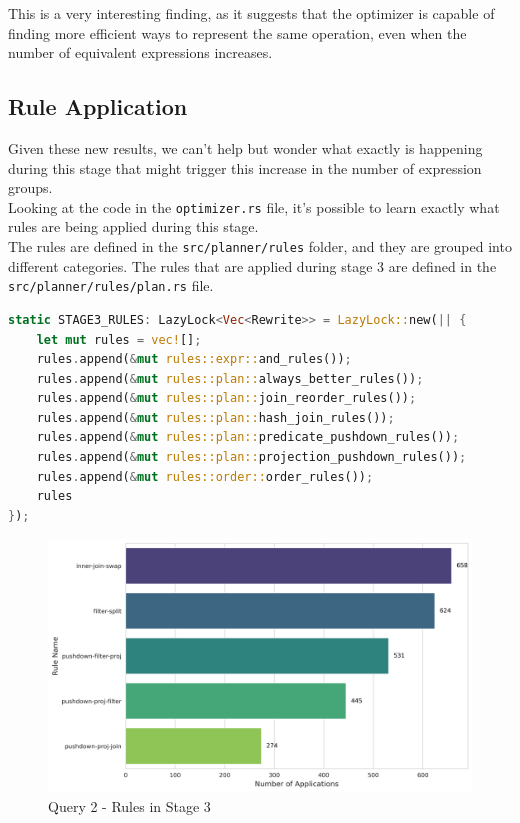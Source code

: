 \documentclass[a4paper,12pt]{scrreprt}
\begin{document}
This is a very interesting finding, as it suggests that the optimizer is capable of finding more efficient ways to represent the same operation, even when the number of equivalent expressions increases. \\

\subsection{Rule Application}

Given these new results, we can't help but wonder what exactly is happening during this stage that might trigger this increase in the number of expression groups. \\ Looking at the code in the \texttt{optimizer.rs} file, it's possible to learn exactly what rules are being applied during this stage. \\

The rules are defined in the \texttt{src/planner/rules} folder, and they are grouped into different categories. The rules that are applied during stage 3 are defined in the \texttt{src/planner/rules/plan.rs} file. \\

\begin{lstlisting}[language=Rust]
static STAGE3_RULES: LazyLock<Vec<Rewrite>> = LazyLock::new(|| {
    let mut rules = vec![];
    rules.append(&mut rules::expr::and_rules());
    rules.append(&mut rules::plan::always_better_rules());
    rules.append(&mut rules::plan::join_reorder_rules());
    rules.append(&mut rules::plan::hash_join_rules());
    rules.append(&mut rules::plan::predicate_pushdown_rules());
    rules.append(&mut rules::plan::projection_pushdown_rules());
    rules.append(&mut rules::order::order_rules());
    rules
});
\end{lstlisting}

\begin{figure}[H]
    \centering
    \includegraphics[width=0.95\linewidth]{img/img_rule_mostpop/top_5_rules_stage3_q2.png}
    \caption{Query 2 - Rules in Stage 3}
    \label{fig:rules2}
\end{figure}
\end{document}
